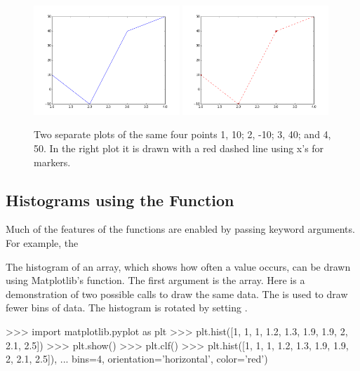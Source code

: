 \documentclass[11pt]{cselabheader}
\begin{document}
\begin{figure}[H]
  \centering
  \includegraphics[width=0.49\textwidth]{img/matplotlib_plot1.png}
  \includegraphics[width=0.49\textwidth]{img/matplotlib_plot2.png}
  \caption{Two separate plots of the same four points 1, 10; 2, -10;
3, 40; and 4, 50. In the right plot it is drawn with a red dashed line using
x's for markers.}
\end{figure}

\subsection{Histograms using the  Function}

Much of the features of the  functions are
enabled by passing keyword arguments. For example, the


The histogram of an array, which shows how often a value occurs, can
be drawn using Matplotlib's  function.  The
first argument is the array. Here is a demonstration of two possible
calls to draw the same data. The  is used to draw
fewer bins of data. The histogram is rotated by setting
.

\begin{pyconcode}
>>> import matplotlib.pyplot as plt
>>> plt.hist([1, 1, 1, 1.2, 1.3, 1.9, 1.9, 2, 2.1, 2.5])
>>> plt.show()
>>> plt.clf()
>>> plt.hist([1, 1, 1, 1.2, 1.3, 1.9, 1.9, 2, 2.1, 2.5]),
...          bins=4, orientation='horizontal', color='red')
\end{pyconcode}
\end{document}
